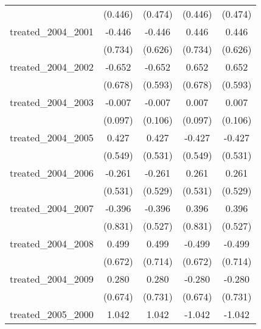 {\begin{tabular}{l*{4}{c}}
            &     (0.446)         &     (0.474)         &     (0.446)         &     (0.474)         \\
[1em]
treated\_2004\_2001&      -0.446         &      -0.446         &       0.446         &       0.446         \\
            &     (0.734)         &     (0.626)         &     (0.734)         &     (0.626)         \\
[1em]
treated\_2004\_2002&      -0.652         &      -0.652         &       0.652         &       0.652         \\
            &     (0.678)         &     (0.593)         &     (0.678)         &     (0.593)         \\
[1em]
treated\_2004\_2003&      -0.007         &      -0.007         &       0.007         &       0.007         \\
            &     (0.097)         &     (0.106)         &     (0.097)         &     (0.106)         \\
[1em]
treated\_2004\_2005&       0.427         &       0.427         &      -0.427         &      -0.427         \\
            &     (0.549)         &     (0.531)         &     (0.549)         &     (0.531)         \\
[1em]
treated\_2004\_2006&      -0.261         &      -0.261         &       0.261         &       0.261         \\
            &     (0.531)         &     (0.529)         &     (0.531)         &     (0.529)         \\
[1em]
treated\_2004\_2007&      -0.396         &      -0.396         &       0.396         &       0.396         \\
            &     (0.831)         &     (0.527)         &     (0.831)         &     (0.527)         \\
[1em]
treated\_2004\_2008&       0.499         &       0.499         &      -0.499         &      -0.499         \\
            &     (0.672)         &     (0.714)         &     (0.672)         &     (0.714)         \\
[1em]
treated\_2004\_2009&       0.280         &       0.280         &      -0.280         &      -0.280         \\
            &     (0.674)         &     (0.731)         &     (0.674)         &     (0.731)         \\
[1em]
treated\_2005\_2000&       1.042         &       1.042         &      -1.042         &      -1.042         \\

\end{tabular}}
